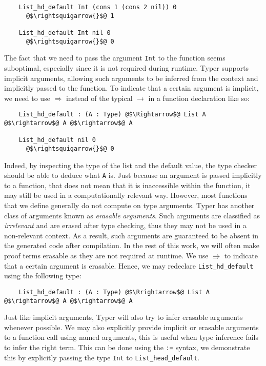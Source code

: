 \documentclass[12pt,twoside,maitrise]{dms}
\theoremstyle{definition}
\numberwithin{equation}{section}
\numberwithin{table}{chapter}
\numberwithin{figure}{chapter}
\newcommand\id[1] {\texttt{#1}}
\begin{document}
\begin{verbatim}
    List_hd_default Int (cons 1 (cons 2 nil)) 0
      @$\rightsquigarrow{}$@ 1

    List_hd_default Int nil 0
      @$\rightsquigarrow{}$@ 0
\end{verbatim}

The fact that we need to pass the argument \id{Int} to the function seems
suboptimal, especially since it is not required during runtime. Typer supports
implicit arguments, allowing such arguments to be inferred from the context and
implicitly passed to the function. To indicate that a certain argument is
implicit, we need to use $\Rightarrow$ instead of the typical $\rightarrow$ in
a function declaration like so:

\begin{verbatim}
    List_hd_default : (A : Type) @$\Rightarrow$@ List A @$\rightarrow$@ A @$\rightarrow$@ A

    List_hd_default nil 0
      @$\rightsquigarrow{}$@ 0
\end{verbatim}

Indeed, by inspecting the type of the list and the default value, the type
checker should be able to deduce what \id{A} is. Just because an argument is
passed implicitly to a function, that does not mean that it is inaccessible
within the function, it may still be used in a computationally relevant way.
However, most functions that we define generally do not compute on type
arguments. Typer has another class of arguments known as \emph{erasable
arguments}. Such arguments are classified as \emph{irrelevant} and are erased
after type checking, thus they may not be used in a non-relevant context. As a
result, such arguments are guaranteed to be absent in the generated code after
compilation. In the rest of this work, we will often make proof terms erasable
as they are not required at runtime. We use $\Rrightarrow$ to indicate that a
certain argument is erasable. Hence, we may redeclare \id{List_hd_default}
using the following type:

\begin{verbatim}
    List_hd_default : (A : Type) @$\Rrightarrow$@ List A @$\rightarrow$@ A @$\rightarrow$@ A
\end{verbatim}

Just like implicit arguments, Typer will also try to infer erasable arguments
whenever possible. We may also explicitly provide implicit or erasable
arguments to a function call using named arguments, this is useful when type
inference fails to infer the right term. This can be done using the \id{:=}
syntax, we demonstrate this by explicitly passing the type \id{Int} to
\id{List_head_default}.
\end{document}

